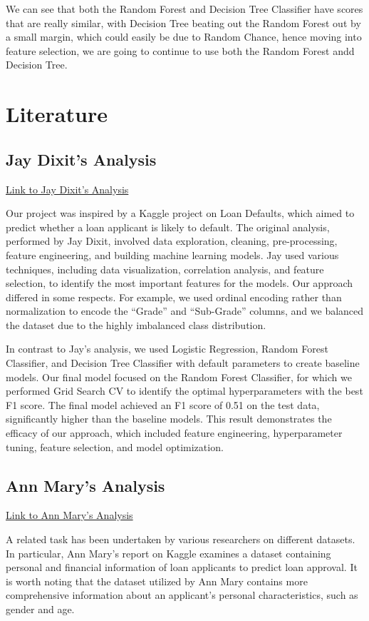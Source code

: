 \documentclass[sigplan]{acmart}
\begin{document}
We can see that both the Random Forest and Decision Tree Classifier have scores that are really similar, with Decision Tree beating out
the Random Forest out by a small margin, which could easily be due to Random Chance, hence moving into feature selection, we are going to
continue to use both the Random Forest andd Decision Tree.

\newpage
\section{Literature}
\subsection{Jay Dixit's Analysis}
\href{https://www.kaggle.com/code/jayrdixit/loan-default-prediction}{Link to Jay Dixit's Analysis}

Our project was inspired by a Kaggle project on Loan Defaults, which aimed to predict whether a loan applicant is likely to default. The original analysis, performed by Jay Dixit, involved data exploration, cleaning, pre-processing, feature engineering, and building machine learning models. Jay used various techniques, including data visualization, correlation analysis, and feature selection, to identify the most important features for the models. Our approach differed in some respects. For example, we used ordinal encoding rather than normalization to encode the “Grade” and “Sub-Grade” columns, and we balanced the dataset due to the highly imbalanced class distribution.

In contrast to Jay's analysis, we used Logistic Regression, Random Forest Classifier, and Decision Tree Classifier with default parameters to create baseline models. Our final model focused on the Random Forest Classifier, for which we performed Grid Search CV to identify the optimal hyperparameters with the best F1 score. The final model achieved an F1 score of 0.51 on the test data, significantly higher than the baseline models. This result demonstrates the efficacy of our approach, which included feature engineering, hyperparameter tuning, feature selection, and model optimization.

\subsection{Ann Mary's Analysis}
\href{https://www.kaggle.com/code/annmary25/loan-status-prediction}{Link to Ann Mary's Analysis}

A related task has been undertaken by various researchers on different datasets. In particular, Ann Mary's report on Kaggle examines a dataset containing personal and financial information of loan applicants to predict loan approval. It is worth noting that the dataset utilized by Ann Mary contains more comprehensive information about an applicant's personal characteristics, such as gender and age.
\end{document}
